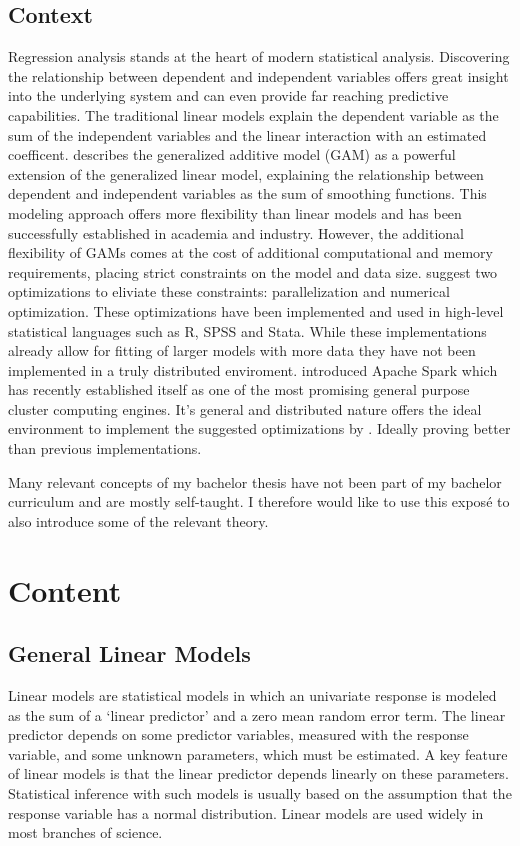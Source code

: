 \documentclass{article}
\begin{document}
    \subsection{Context}
    Regression analysis stands at the heart of modern statistical analysis. Discovering the relationship between dependent and independent variables offers great insight into the underlying system and can even provide far reaching predictive capabilities. The traditional linear models explain the dependent variable as the sum of the independent variables and the linear interaction with an estimated coefficent.\cite{gamBook} describes the generalized additive model (GAM) as a powerful extension of the generalized linear model, explaining the relationship between dependent and independent variables as the sum of smoothing functions. This modeling approach offers more flexibility than linear models and has been successfully established in academia and industry. However, the additional flexibility of GAMs comes at the cost of additional computational and memory requirements, placing strict constraints on the model and data size.\cite{bigdataGAM} suggest two optimizations to eliviate these constraints: parallelization and numerical optimization.
    These optimizations have been implemented and used in high-level statistical languages such as R, SPSS and Stata. While these implementations already allow for fitting of larger models with more data they have not been implemented in a truly distributed enviroment.\cite{spark} introduced Apache Spark which has recently established itself as one of the most promising general purpose cluster computing engines. It's general and distributed nature offers the ideal environment to implement the suggested optimizations by \cite{bigdataGAM}. Ideally proving better than previous implementations.

    Many relevant concepts of my bachelor thesis have not been part of my bachelor curriculum and are mostly self-taught. I therefore would like to use this exposé to also introduce some of the relevant theory.


    \section{Content}
    \subsection{General Linear Models}
    Linear models are statistical models in which an univariate response is modeled as the sum of a ‘linear predictor’ and a zero mean random error term. The linear predictor depends on some predictor variables, measured with the response variable, and some unknown parameters, which must be estimated. A key feature of linear models is that the linear predictor depends linearly on these parameters. Statistical inference with such models is usually based on the assumption that the response variable has a normal distribution. Linear models are used widely in most branches of science.\
\end{document}
